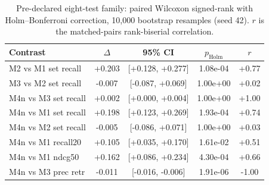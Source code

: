 \begin{table}[h]
\centering\small
\caption{Pre-declared eight-test family: paired Wilcoxon signed-rank with Holm--Bonferroni correction, 10{,}000 bootstrap resamples (seed 42). $r$ is the matched-pairs rank-biserial correlation.}
\label{tab:supp-tests}
\begin{tabular}{lcccc}
\toprule
Contrast & $\Delta$ & 95\% CI & $p_{\mathrm{Holm}}$ & $r$ \\
\midrule
M2 vs M1 set recall & +0.203 & [+0.128, +0.277] & 1.08e-04 & +0.77 \\
M3 vs M2 set recall & -0.007 & [-0.087, +0.069] & 1.00e+00 & +0.02 \\
M4n vs M3 set recall & +0.002 & [+0.000, +0.004] & 1.00e+00 & +1.00 \\
M4n vs M1 set recall & +0.198 & [+0.123, +0.269] & 1.93e-04 & +0.74 \\
M4n vs M2 set recall & -0.005 & [-0.086, +0.071] & 1.00e+00 & +0.03 \\
M4n vs M1 recall20 & +0.105 & [+0.035, +0.170] & 1.61e-02 & +0.51 \\
M4n vs M1 ndcg50 & +0.162 & [+0.086, +0.234] & 4.30e-04 & +0.66 \\
M4n vs M3 prec retr & -0.011 & [-0.016, -0.006] & 1.91e-06 & -1.00 \\
\bottomrule
\end{tabular}
\end{table}
